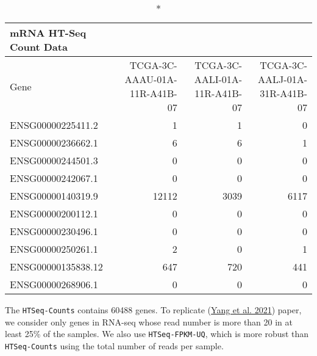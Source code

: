 \documentclass[
]{book}
\newenvironment{Shaded}{\begin{snugshade}}{\end{snugshade}}
\newcommand{\AttributeTok}[1]{\textcolor[rgb]{0.77,0.63,0.00}{#1}}
\newcommand{\CommentTok}[1]{\textcolor[rgb]{0.56,0.35,0.01}{\textit{#1}}}
\newcommand{\ConstantTok}[1]{\textcolor[rgb]{0.00,0.00,0.00}{#1}}
\newcommand{\DecValTok}[1]{\textcolor[rgb]{0.00,0.00,0.81}{#1}}
\newcommand{\FloatTok}[1]{\textcolor[rgb]{0.00,0.00,0.81}{#1}}
\newcommand{\FunctionTok}[1]{\textcolor[rgb]{0.00,0.00,0.00}{#1}}
\newcommand{\NormalTok}[1]{#1}
\newcommand{\OtherTok}[1]{\textcolor[rgb]{0.56,0.35,0.01}{#1}}
\newcommand{\SpecialCharTok}[1]{\textcolor[rgb]{0.00,0.00,0.00}{#1}}
\newcommand{\StringTok}[1]{\textcolor[rgb]{0.31,0.60,0.02}{#1}}
\begin{document}
\captionsetup[table]{labelformat=empty,skip=1pt}
\begin{longtable}{lrrr}
\caption*{
{\large mRNA HT-Seq Count Data}
} \\ 
\toprule
Gene & TCGA-3C-AAAU-01A-11R-A41B-07 & TCGA-3C-AALI-01A-11R-A41B-07 & TCGA-3C-AALJ-01A-31R-A41B-07 \\ 
\midrule
ENSG00000225411.2 & 1 & 1 & 0 \\ 
ENSG00000236662.1 & 6 & 6 & 1 \\ 
ENSG00000244501.3 & 0 & 0 & 0 \\ 
ENSG00000242067.1 & 0 & 0 & 0 \\ 
ENSG00000140319.9 & 12112 & 3039 & 6117 \\ 
ENSG00000200112.1 & 0 & 0 & 0 \\ 
ENSG00000230496.1 & 0 & 0 & 0 \\ 
ENSG00000250261.1 & 2 & 0 & 1 \\ 
ENSG00000135838.12 & 647 & 720 & 441 \\ 
ENSG00000268906.1 & 0 & 0 & 0 \\ 
 \bottomrule
\end{longtable}

The \texttt{HTSeq-Counts} contains 60488 genes.
To replicate (\protect\hyperlink{ref-yang2021model}{Yang et al. 2021}) paper,
we consider only genes in RNA-seq whose read number is more than 20 in at least 25\% of the samples. We also use \texttt{HTSeq-FPKM-UQ}, which is more robust than \texttt{HTSeq-Counts} using the total number of reads per sample.

\begin{Shaded}
\end{Shaded}
\end{document}
